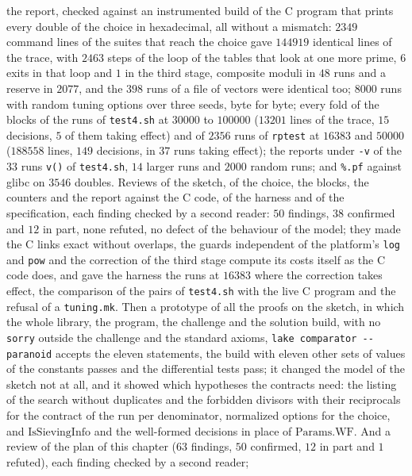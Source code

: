 \begin{itemize}
    the report, checked against an instrumented build of the C program that prints every double of
    the choice in hexadecimal, all without a mismatch: $2349$ command lines of the suites that reach
    the choice gave $144919$ identical lines of the trace, with $2463$ steps of the loop of the
    tables that look at one more prime, $6$ exits in that loop and $1$ in the third stage, composite
    moduli in $48$ runs and a reserve in $2077$, and the $398$ runs of a file of vectors were
    identical too; $8000$ runs with random tuning options over three seeds, byte for byte; every
    fold of the blocks of the runs of \verb|test4.sh| at $30000$ to $100000$ ($13201$ lines of the
    trace, $15$ decisions, $5$ of them taking effect) and of $2356$ runs of \verb|rptest| at $16383$
    and $50000$ ($188558$ lines, $149$ decisions, in $37$ runs taking effect); the reports under
    \verb|-v| of the $33$ runs \verb|v()| of \verb|test4.sh|, $14$ larger runs and $2000$ random
    runs; and \verb|%.pf| against glibc on $3546$ doubles. Reviews of the sketch, of the choice, the
    blocks, the counters and the report against the C code, of the harness and of the specification,
    each finding checked by a second reader: $50$ findings, $38$ confirmed and $12$ in part, none
    refuted, no defect of the behaviour of the model; they made the C links exact without overlaps,
    the guards independent of the platform's \verb|log| and \verb|pow| and the correction of the
    third stage compute its costs itself as the C code does, and gave the harness the runs at
    $16383$ where the correction takes effect, the comparison of the pairs of \verb|test4.sh| with
    the live C program and the refusal of a \verb|tuning.mk|. Then a prototype of all the proofs on
    the sketch, in which the whole library, the program, the challenge and the solution build, with
    no \verb|sorry| outside the challenge and the standard axioms, \verb|lake comparator --paranoid|
    accepts the eleven statements, the build with eleven other sets of values of the constants
    passes and the differential tests pass; it changed the model of the sketch not at all, and it
    showed which hypotheses the contracts need: the listing of the search without duplicates and the
    forbidden divisors with their reciprocals for the contract of the run per denominator,
    normalized options for the choice, and $\mathrm{IsSievingInfo}$ and the well-formed decisions in
    place of $\mathrm{Params.WF}$. And a review of the plan of this chapter ($63$ findings, $50$
    confirmed, $12$ in part and $1$ refuted), each finding checked by a second reader;

\end{itemize}
